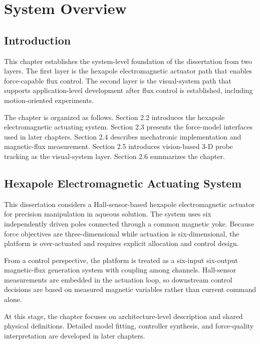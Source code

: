 
\chapter{System Overview}

\section{Introduction}

This chapter establishes the system-level foundation of the dissertation from two layers. The first layer is the hexapole electromagnetic actuator path that enables force-capable flux control. The second layer is the visual-system path that supports application-level development after flux control is established, including motion-oriented experiments.

The chapter is organized as follows. Section 2.2 introduces the hexapole electromagnetic actuating system. Section 2.3 presents the force-model interfaces used in later chapters. Section 2.4 describes mechatronic implementation and magnetic-flux measurement. Section 2.5 introduces vision-based 3-D probe tracking as the visual-system layer. Section 2.6 summarizes the chapter.

\section{Hexapole Electromagnetic Actuating System}

This dissertation considers a Hall-sensor-based hexapole electromagnetic actuator for precision manipulation in aqueous solution. The system uses six independently driven poles connected through a common magnetic yoke. Because force objectives are three-dimensional while actuation is six-dimensional, the platform is over-actuated and requires explicit allocation and control design.

From a control perspective, the platform is treated as a six-input six-output magnetic-flux generation system with coupling among channels. Hall-sensor measurements are embedded in the actuation loop, so downstream control decisions are based on measured magnetic variables rather than current command alone.

At this stage, the chapter focuses on architecture-level description and shared physical definitions. Detailed model fitting, controller synthesis, and force-quality interpretation are developed in later chapters.

